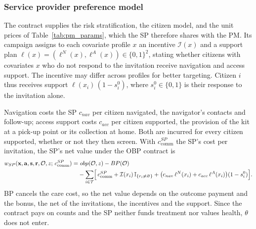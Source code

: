 \documentclass[12pt]{article}
\begin{document}
\subsubsection{Service provider preference model}\label{sec:obp_sp}
The contract supplies the risk stratification, the citizen model, and the unit prices of Table~\ref{tab:pm_params}, which the SP therefore shares with the PM. Its campaign assigns to each covariate profile $x$ an incentive $\mathcal{I}(x)$ and a support plan $\ell(x) = (\ell^{N}(x), \ell^{A}(x)) \in \{0,1\}^2$, stating whether citizens with covariates $x$ who do not respond to the invitation receive navigation and access support. The incentive may differ across profiles for better targeting. Citizen $i$ thus receives support $\ell(x_i)\,(1 - s_i^0)$, where $s_i^0 \in \{0,1\}$ is their response to the invitation alone.

Navigation costs the SP $c_{nav}$ per citizen navigated, the navigator's contacts and follow-up; access support costs $c_{acc}$ per citizen supported, the provision of the kit at a pick-up point or its collection at home. Both are incurred for every citizen supported, whether or not they then screen. With $c^{SP}_{\text{comm}}$ the SP's cost per invitation, the SP's net value under the OBP contract is
\begin{align}\label{eq:wsp}
  w_{SP}(\mathbf{x}, \mathbf{a}, \mathbf{s}, \mathbf{r}, \mathcal{O}, z;\, c^{SP}_{\text{comm}})
  =& \ obp(\mathcal{O}, z) - BP(\mathcal{O}) \\
  &- \sum_{i \in \mathcal{T}}
    \Bigl[\, c^{SP}_{\text{comm}} + \mathcal{I}(x_i)\, \mathbb{I}_{\{r_i \neq \varnothing\}}
    + \big(c_{nav}\, \ell^{N}(x_i) + c_{acc}\, \ell^{A}(x_i)\big)(1 - s_i^0) \Bigr]. \nonumber
\end{align}
BP cancels the care cost, so the net value depends on the outcome payment and the bonus, the net of the invitations, the incentives and the support. Since the contract pays on counts and the SP neither funds treatment nor values health, $\theta$ does not enter.
\end{document}
